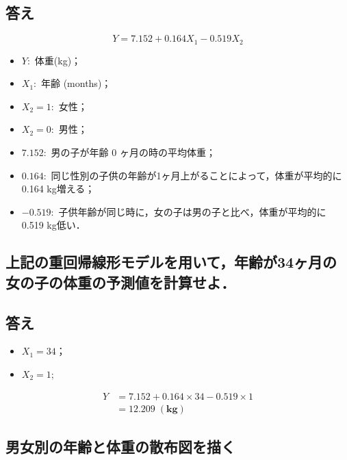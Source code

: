 \documentclass[11pt,]{problemset}
\providecommand{\tightlist}{%
  \setlength{\itemsep}{0pt}\setlength{\parskip}{0pt}}
\begin{document}
\hypertarget{-4}{%
\subsection{答え}\label{-4}}

\[
Y = 7.152 + 0.164 X_1 - 0.519X_2
\]

\begin{itemize}
\tightlist
\item
  \(Y:\) 体重(kg)；
\item
  \(X_1:\) 年齢 (months)；
\item
  \(X_2 = 1:\) 女性；
\item
  \(X_2 = 0:\) 男性；
\item
  \(7.152:\) 男の子が年齢 0 ヶ月の時の平均体重；
\item
  \(0.164:\)
  同じ性別の子供の年齢が1ヶ月上がることによって，体重が平均的に 0.164
  kg増える；
\item
  \(-0.519:\) 子供年齢が同じ時に，女の子は男の子と比べ，体重が平均的に
  0.519 kg低い．
\end{itemize}

\hypertarget{34}{%
\subsection{上記の重回帰線形モデルを用いて，年齢が34ヶ月の女の子の体重の予測値を計算せよ．}\label{34}}

\hypertarget{-5}{%
\subsection{答え}\label{-5}}

\begin{itemize}
\tightlist
\item
  \(X_1 = 34\)；
\item
  \(X_2 = 1\);
\end{itemize}

\[
\begin{aligned}
Y & = 7.152 + 0.164 \times 34 -0.519\times 1 \\
  & = 12.209\; \mathbf{(kg)}
\end{aligned}
\]

\bigskip\bigskip\bigskip\bigskip\bigskip\bigskip

\subsection{男女別の年齢と体重の散布図を描く}
\end{document}
